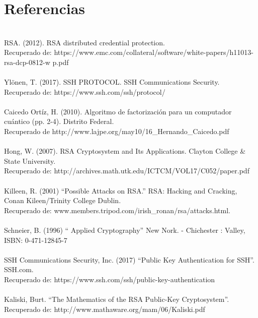 \documentclass[12pt, a4paper]{article}
\begin{document}
	\section{Referencias}

	\\RSA. (2012). RSA distributed credential protection.
	\\Recuperado de: https://www.emc.com/collateral/software/white-papers/h11013-rsa-dcp-0812-w p.pdf
	\\

	\\Ylönen, T. (2017). SSH PROTOCOL. SSH Communications Security.
	\\Recuperado de: https://www.ssh.com/ssh/protocol/
	\\

	\\Caicedo Ortíz, H. (2010). Algoritmo de factorización para un computador cuántico (pp. 2-4). Distrito Federal.
	\\Recuperado de http://www.lajpe.org/may10/16_Hernando_Caicedo.pdf
	\\

	\\Hong, W. (2007). RSA Cryptosystem and Its Applications. Clayton College & State University.
	\\Recuperado de: http://archives.math.utk.edu/ICTCM/VOL17/C052/paper.pdf
	\\

	\\Killeen, R. (2001) “Possible Attacks on RSA.” RSA: Hacking and Cracking, Conan Kileen/Trinity College Dublin.
	\\Recuperado de: www.members.tripod.com/irish_ronan/rsa/attacks.html.
	\\

	\\Schneier, B. (1996) “ Applied Cryptography” New Nork. - Chichester : Valley, ISBN: 0-471-12845-7
	\\

	\\SSH Communications Security, Inc. (2017) “Public Key Authentication for SSH”. SSH.com.
	\\Recuperado de: https://www.ssh.com/ssh/public-key-authentication
	\\

	\\Kaliski, Burt. “The Mathematics of the RSA Public-Key Cryptosystem”.
	\\Recuperado de: http://www.mathaware.org/mam/06/Kaliski.pdf
\end{document}
